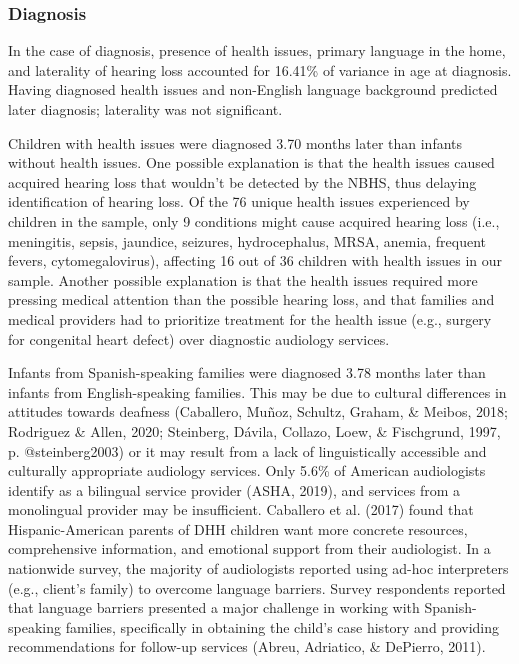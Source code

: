 \documentclass[
  english,
  man]{apa6}
\begin{document}
\hypertarget{diagnosis}{%
\subsubsection{Diagnosis}\label{diagnosis}}

In the case of diagnosis, presence of health issues, primary language in the home, and laterality of hearing loss accounted for 16.41\% of variance in age at diagnosis. Having diagnosed health issues and non-English language background predicted later diagnosis; laterality was not significant.

Children with health issues were diagnosed 3.70 months later than infants without health issues. One possible explanation is that the health issues caused acquired hearing loss that wouldn't be detected by the NBHS, thus delaying identification of hearing loss. Of the 76 unique health issues experienced by children in the sample, only 9 conditions might cause acquired hearing loss (i.e., meningitis, sepsis, jaundice, seizures, hydrocephalus, MRSA, anemia, frequent fevers, cytomegalovirus), affecting 16 out of 36 children with health issues in our sample. Another possible explanation is that the health issues required more pressing medical attention than the possible hearing loss, and that families and medical providers had to prioritize treatment for the health issue (e.g., surgery for congenital heart defect) over diagnostic audiology services.

Infants from Spanish-speaking families were diagnosed 3.78 months later than infants from English-speaking families. This may be due to cultural differences in attitudes towards deafness (Caballero, Muñoz, Schultz, Graham, \& Meibos, 2018; Rodriguez \& Allen, 2020; Steinberg, Dávila, Collazo, Loew, \& Fischgrund, 1997, p. @steinberg2003) or it may result from a lack of linguistically accessible and culturally appropriate audiology services. Only 5.6\% of American audiologists identify as a bilingual service provider (ASHA, 2019), and services from a monolingual provider may be insufficient. Caballero et al. (2017) found that Hispanic-American parents of DHH children want more concrete resources, comprehensive information, and emotional support from their audiologist. In a nationwide survey, the majority of audiologists reported using ad-hoc interpreters (e.g., client's family) to overcome language barriers. Survey respondents reported that language barriers presented a major challenge in working with Spanish-speaking families, specifically in obtaining the child's case history and providing recommendations for follow-up services (Abreu, Adriatico, \& DePierro, 2011).
\end{document}
